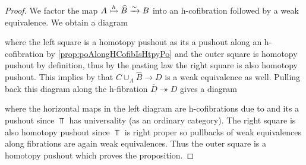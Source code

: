 \begin{prop}
\begin{proof}
        We factor the map $A\xtailrightarrow{h}\widehat{B}\xrightarrow{\sim} B$ into an h-cofibration followed by a weak equivalence.
        We obtain a diagram 
        \begin{center}
        \end{center}
        where the left square is a homotopy pushout as its a pushout along an h-cofibration by \cref{prop:poAlongHCofibIsHtpyPo} and the outer square is homotopy pushout by definition, thus by the pasting law the right square is also homotopy pushout. 
        This implies by %
        that $C\cup_{A}\widehat{B}\to D$ is a weak equivalence as well.
        Pulling back this diagram along the h-fibration $\overline{D}\twoheadrightarrow D$ gives a diagram 
        \begin{center}
        \end{center}
        where the horizontal maps in the left diagram are h-cofibrations due to %
        and its a pushout since $\Top$ has universality (as an ordinary category). %
        The right square is also homotopy pushout since $\Top$ is right proper so pullbacks of weak equivalences along fibrations are again weak equivalences. 
        Thus the outer square is a homotopy pushout which proves the proposition. 
    \end{proof}
\end{prop}
